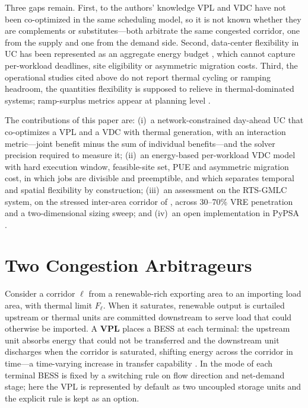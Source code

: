 \documentclass[conference]{IEEEtran}
\begin{document}
Three gaps remain. First, to the authors' knowledge VPL and VDC have not been co-optimized in the same scheduling model, so it is not known whether they are complements or substitutes---both arbitrate the same congested corridor, one from the supply and one from the demand side. Second, data-center flexibility in UC has been represented as an aggregate energy budget \cite{wan2026scuc}, which cannot capture per-workload deadlines, site eligibility or asymmetric migration costs. Third, the operational studies cited above do not report thermal cycling or ramping headroom, the quantities flexibility is supposed to relieve in thermal-dominated systems; ramp-surplus metrics appear at planning level \cite{ferreira2026}.

The contributions of this paper are: (i)~a network-constrained day-ahead UC that co-optimizes a VPL and a VDC with thermal generation, with an interaction metric---joint benefit minus the sum of individual benefits---and the solver precision required to measure it; (ii)~an energy-based per-workload VDC model with hard execution window, feasible-site set, PUE and asymmetric migration cost, in which jobs are divisible and preemptible, and which separates temporal and spatial flexibility by construction; (iii)~an assessment on the RTS-GMLC system, on the stressed inter-area corridor of \cite{ferreira2026}, across 30--70\% VRE penetration and a two-dimensional sizing sweep; and (iv)~an open implementation in PyPSA \cite{brown2018pypsa}.

\section{Two Congestion Arbitrageurs}
\label{sec:concepts}

Consider a corridor $\ell$ from a renewable-rich exporting area to an importing load area, with thermal limit $F_\ell$. When it saturates, renewable output is curtailed upstream or thermal units are committed downstream to serve load that could otherwise be imported. A \textbf{VPL} places a BESS at each terminal: the upstream unit absorbs energy that could not be transferred and the downstream unit discharges when the corridor is saturated, shifting energy across the corridor in time---a time-varying increase in transfer capability \cite{irena2020vpl,wang2025vt}. In \cite{ferreira2026} the mode of each terminal BESS is fixed by a switching rule on flow direction and net-demand stage; here the VPL is represented by default as two uncoupled storage units and the explicit rule is kept as an option.
\end{document}
